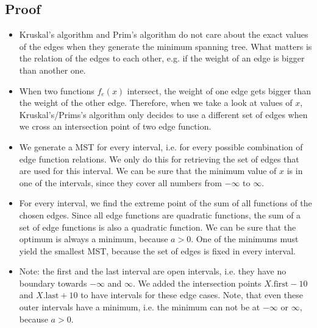 \documentclass[12pt]{article}
\begin{document}
\subsection*{Proof}
\begin{itemize}
	\item Kruskal's algorithm and Prim's algorithm do not care about the exact values of the edges when they generate the minimum spanning tree. What matters is the relation of the edges to each other, e.g. if the weight of an edge is bigger than another one.
	\item When two functions $f_e(x)$ intersect, the weight of one edge gets bigger than the weight of the other edge. Therefore, when we take a look at values of $x$, Kruskal's/Prims's algorithm only decides to use a different set of edges when we cross an intersection point of two edge function.
	\item We generate a MST for every interval, i.e. for every possible combination of edge function relations. We only do this for retrieving the set of edges that are used for this interval. We can be sure that the minimum value of $x$ is in one of the intervals, since they cover all numbers from $-\infty$ to $\infty$.
	\item For every interval, we find the extreme point of the sum of all functions of the chosen edges. Since all edge functions are quadratic functions, the sum of a set of edge functions is also a quadratic function. We can be sure that the optimum is always a minimum, because $a > 0$. One of the minimums must yield the smallest MST, because the set of edges is fixed in every interval.
	\item Note: the first and the last interval are open intervals, i.e. they have no boundary towards $-\infty$ and $\infty$. We added the intersection points $X.\mbox{first} - 10$ and $X.\mbox{last} + 10$ to have intervals for these edge cases. Note, that even these outer intervals have a minimum, i.e. the minimum can not be at $-\infty$ or $\infty$, because $a>0$.
\end{itemize}
\end{document}
